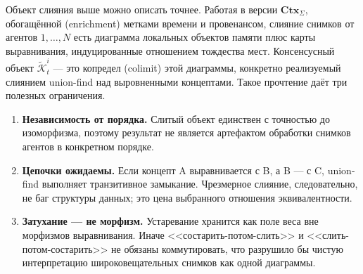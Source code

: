 \documentclass{article}
\begin{document}
Объект слияния выше можно описать точнее. Работая в версии
$\mathbf{Ctx}_\Sigma$, обогащённой (enrichment) метками времени и
провенансом, слияние снимков от агентов $1,\dots,N$ есть диаграмма
локальных объектов памяти плюс карты выравнивания, индуцированные
отношением тождества мест. Консенсусный объект
$\widetilde{\mathcal{K}}_t^i$ --- это копредел (colimit) этой
диаграммы, конкретно реализуемый слиянием union-find над выровненными
концептами. Такое прочтение даёт три полезных ограничения.
\begin{enumerate}[leftmargin=20pt,itemsep=2pt,topsep=2pt]
\item \textbf{Независимость от порядка.} Слитый объект единствен с точностью до изоморфизма, поэтому результат не является артефактом обработки снимков агентов в конкретном порядке.
\item \textbf{Цепочки ожидаемы.} Если концепт A выравнивается с B, а B --- с C, union-find выполняет транзитивное замыкание. Чрезмерное слияние, следовательно, не баг структуры данных; это цена выбранного отношения эквивалентности.
\item \textbf{Затухание --- не морфизм.} Устаревание хранится как поле веса вне морфизмов выравнивания. Иначе <<состарить-потом-слить>> и <<слить-потом-состарить>> не обязаны коммутировать, что разрушило бы чистую интерпретацию широковещательных снимков как одной диаграммы.
\end{enumerate}
\end{document}
